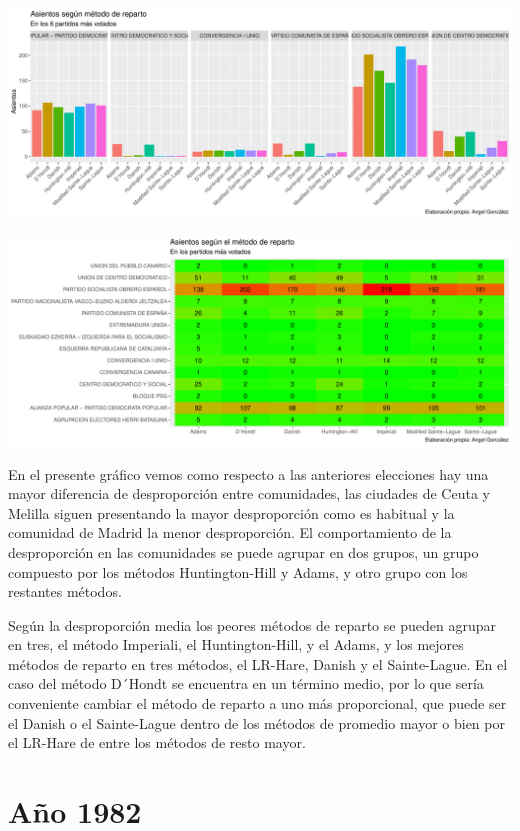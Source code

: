 \documentclass[12pt,a4paper,]{book}
\numberwithin{dummy}{section}
\theoremstyle{ocrenumbox}
\theoremstyle{blacknumex}
\theoremstyle{blacknumbox}
\theoremstyle{ocrenum}
\theoremstyle{ocrenum}
\begin{document}
\begin{center}\includegraphics[width=1\linewidth]{figurasR/unnamed-chunk-77-1} \end{center}

\begin{center}\includegraphics[width=1\linewidth]{figurasR/unnamed-chunk-77-2} \end{center}

En el presente gráfico vemos como respecto a las anteriores elecciones
hay una mayor diferencia de desproporción entre comunidades, las
ciudades de Ceuta y Melilla siguen presentando la mayor desproporción
como es habitual y la comunidad de Madrid la menor desproporción. El
comportamiento de la desproporción en las comunidades se puede agrupar
en dos grupos, un grupo compuesto por los métodos Huntington-Hill y
Adams, y otro grupo con los restantes métodos.

Según la desproporción media los peores métodos de reparto se pueden
agrupar en tres, el método Imperiali, el Huntington-Hill, y el Adams, y
los mejores métodos de reparto en tres métodos, el LR-Hare, Danish y el
Sainte-Lague. En el caso del método D´Hondt se encuentra en un término
medio, por lo que sería conveniente cambiar el método de reparto a uno
más proporcional, que puede ser el Danish o el Sainte-Lague dentro de
los métodos de promedio mayor o bien por el LR-Hare de entre los métodos
de resto mayor.

\hypertarget{auxf1o-1982}{%
\section{Año 1982}\label{auxf1o-1982}}
\end{document}
